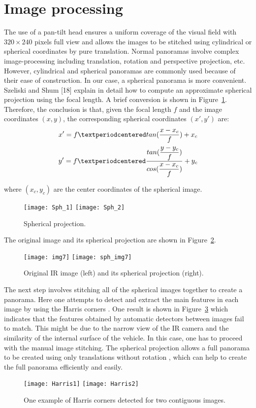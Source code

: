 \documentclass{tQRT2e}
\begin{document}
\section{Image processing}
The use of a pan-tilt head ensures a uniform coverage of the visual field with $ 320×240 $ pixels full view and allows the images to be stitched using cylindrical or spherical coordinates by pure translation. Normal panoramas involve complex image-processing including translation, rotation and perspective projection, etc. However, cylindrical and spherical panoramas are commonly used because of their ease of construction. In our case, a spherical panorama is more convenient. Szeliski and Shum [18] explain in detail how to compute an approximate spherical projection using the focal length. A brief conversion is shown in Figure~\ref{Sph_pro}. Therefore, the conclusion is that, given the focal length $ f $ and the image coordinates $ (x, y) $, the corresponding spherical coordinates $ (x′, y′) $ are:
\begin{align}
x'={} f·tan(\dfrac{x-x_c}{f})+x_c \notag \\
y'=f·\frac{tan(\dfrac{y-y_c}{f})}{cos(\dfrac{x-x_c}{f})} +y_c
\end{align}

where $ (x_c,y_c) $ are the center coordinates of the spherical image.
\begin{figure}[ht]
	\centering
	\texttt{[image: Sph\_1]}
	\texttt{[image: Sph\_2]}
	\caption{Spherical projection.}
	\label{Sph_pro}
\end{figure}

The original image and its spherical projection are shown in Figure~\ref{Orig_sph}.
\begin{figure}[ht]
	\centering
	\texttt{[image: img7]}
	\texttt{[image: sph\_img7]}
	\caption{Original IR image (left) and its spherical projection (right).}
	\label{Orig_sph}
\end{figure}

The next step involves stitching all of the spherical images together to create a panorama. Here one attempts to detect and extract the main features in each image by using the Harris corners \cite{Harris1988}. One result is shown in Figure~\ref{Harris} which indicates that the features obtained by automatic detectors between images fail to match. This might be due to the narrow view of the IR camera and the similarity of the internal surface of the vehicle. In this case, one has to proceed with the manual image stitching.  The spherical projection allows a full panorama to be created using only translations without rotation \cite{Szeliski1997}, which can help to create the full panorama efficiently and easily.
\begin{figure}[ht]
	\texttt{[image: Harris1]}
	\texttt{[image: Harris2]}
	\caption{One example of Harris corners detected for two contiguous images.}
	\label{Harris}
\end{figure}
\end{document}
